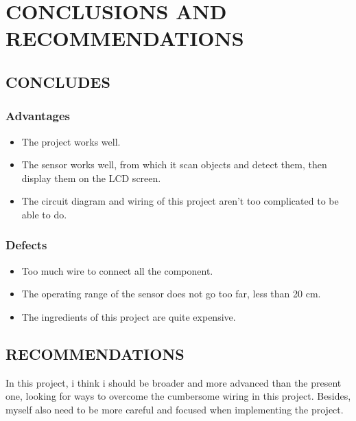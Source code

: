 \documentclass[13pt,a4paper]{report}
\begin{document}
    \chapter{CONCLUSIONS AND RECOMMENDATIONS}
    \renewcommand{\headrulewidth}{0.5pt}
    \renewcommand{\footrulewidth}{0.5pt}
    \thispagestyle{fancy}
    \fancyhf{}
    \raggedright
        \section{CONCLUDES}
            \subsection{\large{Advantages}}
                \begin{itemize}
                    \item The project works well.
                    \item The sensor works well, from which it scan objects and detect them, then 
                    display them on the LCD screen.
                    \item The circuit diagram and wiring of this project aren't too complicated to be 
                    able to do.
                \end{itemize}
            \subsection{\large{Defects}}
                \begin{itemize}
                    \item Too much wire to connect all the component.
                    \item The operating range of the sensor does not go too far, less than 20 cm.
                    \item The ingredients of this project are quite expensive.
                \end{itemize}
        \section{RECOMMENDATIONS}
            In this project, i think i should be broader and more advanced than the present one, 
            looking for ways to overcome the cumbersome wiring in this project. Besides, myself also 
            need to be more careful and focused when implementing the project.
\end{document}
